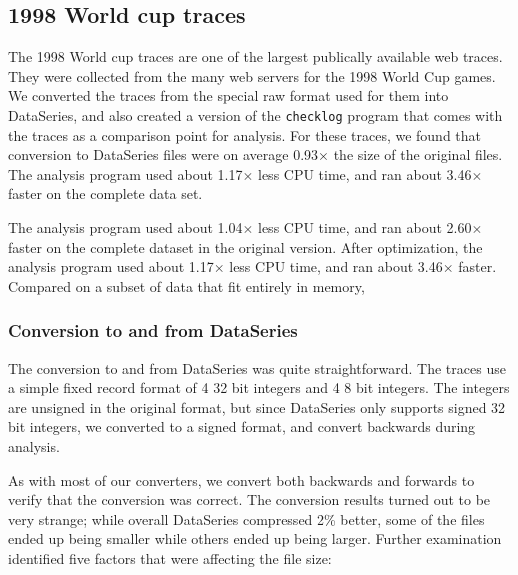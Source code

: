\subsection{1998 World cup traces}\label{sec:world-cup-1998}


The 1998 World cup traces\cite{ita-wcweb98} are one of the largest
publically available web traces.  They were collected from the many
web servers for the 1998 World Cup games.  We converted the traces
from the special raw format used for them into DataSeries, and also
created a version of the {\tt checklog} program that comes with the
traces as a comparison point for analysis.  For these traces, we found
that conversion to DataSeries files were on average 0.93$\times$ the
size of the original files. The analysis program used about
1.17$\times$ less CPU time, and ran about 3.46$\times$ faster on the
complete data set.

The analysis program used about
1.04$\times$ less CPU time, and ran about 2.60$\times$ faster on the
complete dataset in the original version.  After optimization, the
analysis program used about 1.17$\times$ less CPU time, and ran about
3.46$\times$ faster.  Compared on a subset of data that fit entirely
in memory,

\subsubsection{Conversion to and from DataSeries}

The conversion to and from DataSeries was quite straightforward.  The
traces use a simple fixed record format of 4 32 bit integers and 4 8
bit integers.  The integers are unsigned in the original format, but
since DataSeries only supports signed 32 bit integers, we converted
to a signed format, and convert backwards during analysis.

As with most of our converters, we convert both backwards and forwards
to verify that the conversion was correct.  The conversion results
turned out to be very strange; while overall DataSeries compressed 2\%
better, some of the files ended up being smaller while others ended up
being larger.  Further examination identified five factors that were
affecting the file size:

